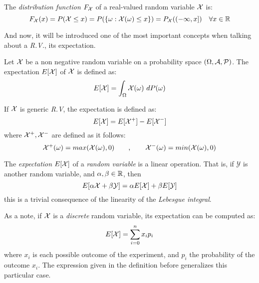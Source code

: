 \begin{ndef}
The \emph{distribution function } $F_{\mathcal{X}}$ of a real-valued random variable $\mathcal{X}$ is:
$$
F_{\mathcal{X}}(x) = P(\mathcal{X} \leq x) = P(\{\omega : \mathcal{X}(\omega) \leq x\}) = P_{\mathcal{X}}((-\infty,x]) \quad \forall x \in \mathbb R
$$
\end{ndef}

And now, it will be introduced one of the most important concepts when talking about a \emph{R.V.}, its expectation.

\begin{ndef}
Let $\mathcal{X}$ be a non negative random variable on a probability space $(\Omega,\mathcal{A},\mathcal{P})$. The expectation $E[\mathcal{X}]$ of $\mathcal{X}$ is defined as:
$$
E[\X] = \int_\Omega \X(\omega) \ dP(\omega)
$$
\end{ndef}
If $\mathcal{X}$ is generic \emph{R.V}, the expectation is defined as:
$$
E[\mathcal{X}] = E[\mathcal{X}^+] - E[\mathcal{X}^-]
$$
where $\mathcal{X}^+,\mathcal{X}^-$ are defined as it follows:
$$
\mathcal{X}^+(\omega) = max(\mathcal{X}(\omega),0) \quad \quad , \quad \quad \mathcal{X}^-(\omega) = min(\mathcal{X}(\omega),0)
$$

The \emph{expectation} $E[\mathcal{X}]$ of a \emph{random variable} is a linear operation. That is, if $\mathcal Y$ is another random variable, and $\alpha,\beta \in \mathbb{R}$, then
$$
E[\alpha \mathcal{X} + \beta \mathcal Y] = \alpha E[\mathcal{X}] + \beta E[\mathcal Y]
$$
this is a trivial consequence of the linearity of the \emph{Lebesgue integral}.

As a note, if $\mathcal{X}$ is a \emph{discrete} random variable, its expectation can be computed as:
$$
E[\mathcal{X}] = \sum_{i = 0}^n x_i p_i
$$
where $x_i$ is each possible outcome of the experiment, and $p_i$ the probability of the outcome $x_i$. The expression given in the definition before generalizes this particular case.


